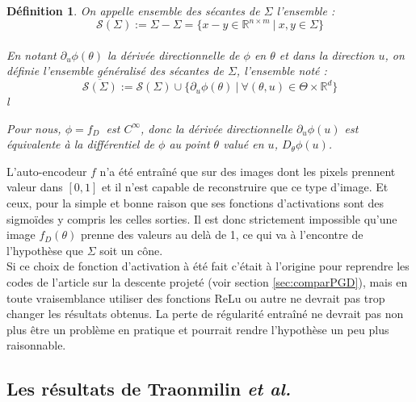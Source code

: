 \documentclass[hidelinks, french]{article} %
\newcommand{\R}{\mathbb{R}}
\theoremstyle{enonce}
\newtheorem{definition}{Définition}
\theoremstyle{special}
\theoremstyle{rq}
\theoremstyle{exo}
\theoremstyle{demo}
\begin{document}
\begin{definition} On appelle \emph{ensemble des sécantes de $\Sigma$} l'ensemble :
\[\mathcal{S}(\Sigma) := \Sigma-\Sigma = \big\{x-y\in\R^{n\times m}\ |\ x,y\in\Sigma\big\}\]
\\
En notant $\partial_u\phi(\theta)$ la dérivée directionnelle de $\phi$ en $\theta$ et dans la direction $u$, on définie l'\emph{ensemble généralisé des sécantes de $\Sigma$}, l'ensemble noté :
\[\overline{\mathcal{S}(\Sigma)}:=\mathcal{S}(\Sigma)\cup\Big\{\partial_u\phi(\theta)\ |\ \forall (\theta,u)\in\Theta\times\R^d\Big\}\]{\color{white}l}

\emph{Pour nous, $\phi=f_D\ $ est $C^\infty$, donc la dérivée directionnelle $\partial_u\phi(u)$ est équivalente à la différentiel de $\phi$ au point $\theta$ valué en $u$, $D_\theta\phi(u)$.}
\end{definition}

L'auto-encodeur $f$ n'a été entraîné que sur des images dont les pixels prennent valeur dans $[0,1]$ et il n'est capable de reconstruire que ce type d'image. Et ceux, pour la simple et bonne raison que ses fonctions d'activations sont des sigmoïdes y compris les celles sorties. Il est donc strictement impossible qu'une image $f_D(\theta)$ prenne des valeurs au delà de 1, ce qui va à l'encontre de l'hypothèse que $\Sigma$ soit un cône.
\\
Si ce choix de fonction d'activation à été fait c'était à l'origine pour reprendre les codes de l'article \cite{peng_solving_2019} sur la descente projeté (voir section \ref{sec:comparPGD}), mais en toute vraisemblance utiliser des fonctions ReLu ou autre ne devrait pas trop changer les résultats obtenus. 
La perte de régularité entraîné ne devrait pas non plus être un problème en pratique et pourrait rendre l'hypothèse un peu plus raisonnable. 
\\




\subsection{Les résultats de Traonmilin {\itshape et al.}}\label{sec:article2/2}
\end{document}
